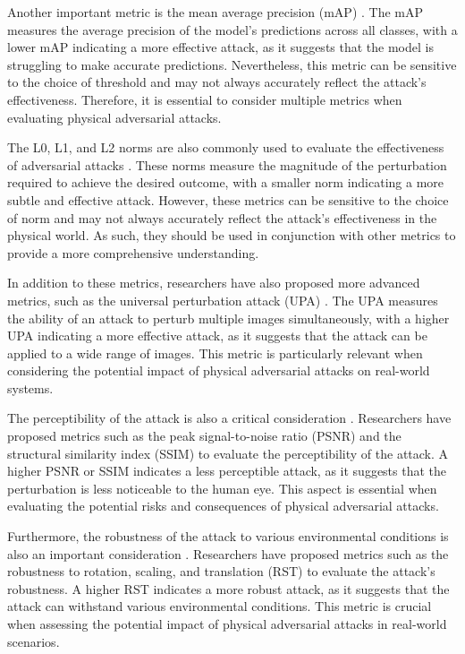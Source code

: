 \documentclass[11pt]{article}
\begin{document}
Another important metric is the mean average precision (mAP) \cite{ref101}. The mAP measures the average precision of the model's predictions across all classes, with a lower mAP indicating a more effective attack, as it suggests that the model is struggling to make accurate predictions. Nevertheless, this metric can be sensitive to the choice of threshold and may not always accurately reflect the attack's effectiveness. Therefore, it is essential to consider multiple metrics when evaluating physical adversarial attacks.

The L0, L1, and L2 norms are also commonly used to evaluate the effectiveness of adversarial attacks \cite{ref102}. These norms measure the magnitude of the perturbation required to achieve the desired outcome, with a smaller norm indicating a more subtle and effective attack. However, these metrics can be sensitive to the choice of norm and may not always accurately reflect the attack's effectiveness in the physical world. As such, they should be used in conjunction with other metrics to provide a more comprehensive understanding.

In addition to these metrics, researchers have also proposed more advanced metrics, such as the universal perturbation attack (UPA) \cite{ref103}. The UPA measures the ability of an attack to perturb multiple images simultaneously, with a higher UPA indicating a more effective attack, as it suggests that the attack can be applied to a wide range of images. This metric is particularly relevant when considering the potential impact of physical adversarial attacks on real-world systems.

The perceptibility of the attack is also a critical consideration \cite{ref104}. Researchers have proposed metrics such as the peak signal-to-noise ratio (PSNR) and the structural similarity index (SSIM) to evaluate the perceptibility of the attack. A higher PSNR or SSIM indicates a less perceptible attack, as it suggests that the perturbation is less noticeable to the human eye. This aspect is essential when evaluating the potential risks and consequences of physical adversarial attacks.

Furthermore, the robustness of the attack to various environmental conditions is also an important consideration \cite{ref105}. Researchers have proposed metrics such as the robustness to rotation, scaling, and translation (RST) to evaluate the attack's robustness. A higher RST indicates a more robust attack, as it suggests that the attack can withstand various environmental conditions. This metric is crucial when assessing the potential impact of physical adversarial attacks in real-world scenarios.
\end{document}
